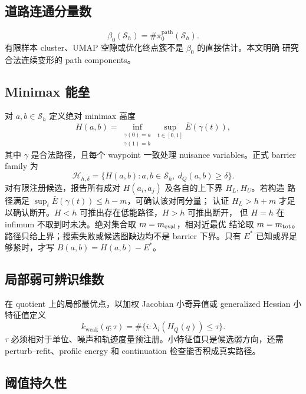 \documentclass[UTF8,a4paper,11pt]{ctexart}
\newcommand{\Sset}{\mathcal S}
\begin{document}
\subsection{道路连通分量数}

\begin{equation}
  \beta_0(\Sset_h)
  =\#\pi_0^{\mathrm{path}}(\Sset_h).
\end{equation}
有限样本 cluster、UMAP 空隙或优化终点簇不是 $\beta_0$ 的直接估计。本文明确
研究合法连续变形的 path components。

\subsection{Minimax 能垒}

对 $a,b\in\Sset_h$ 定义绝对 minimax 高度
\begin{equation}
  H(a,b)=\inf_{\substack{\gamma(0)=a\\\gamma(1)=b}}
  \sup_{t\in[0,1]}\bar E(\gamma(t)),
  \label{eq:barrier}
\end{equation}
其中 $\gamma$ 是合法路径，且每个 waypoint 一致处理 nuisance variables。正式
barrier family 为
\begin{equation}
  \mathcal H_{h,\delta}
  =\{H(a,b):a,b\in\Sset_h,\ d_Q(a,b)\ge\delta\}.
\end{equation}
对有限注册候选，报告所有成对 $H(a_i,a_j)$ 及各自的上下界 $H_L,H_U$。若构造
路径满足 $\sup_t\bar E(\gamma(t))\le h-m$，可确认该对同分量；
认证 $H_L>h+m$ 才足以确认断开。$H<h$ 可推出存在低能路径，$H>h$ 可推出断开，
但 $H=h$ 在 infimum 不取到时未决。绝对集合取 $m=m_{\rm eval}$，相对近最优
结论取 $m=m_{\rm tot}$。路径只给上界；搜索失败或候选图缺边均不是 barrier
下界。只有 $E^*$ 已知或界足够紧时，才写 $B(a,b)=H(a,b)-E^*$。

\subsection{局部弱可辨识维数}

在 quotient 上的局部最优点，以加权 Jacobian 小奇异值或 generalized Hessian
小特征值定义
\begin{equation}
  k_{\mathrm{weak}}(q;\tau)
  =\#\{i:\lambda_i(H_Q(q))\le\tau\}.
  \label{eq:weak-dim}
\end{equation}
$\tau$ 必须相对于单位、噪声和轨迹度量预注册。小特征值只是候选弱方向，还需
perturb--refit、profile energy 和 continuation 检查能否积成真实路径。

\subsection{阈值持久性}
\end{document}
